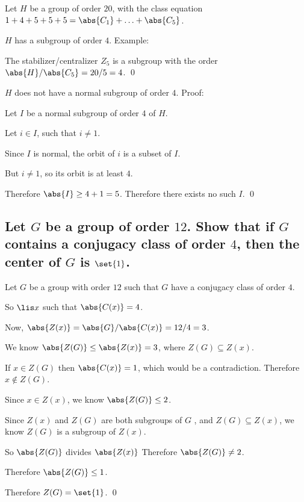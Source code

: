 
        Let $H$ be a group of order $20$, with the class equation $1+4+5+5+5 = \abs{C_1} +\hdots + \abs{C_5}$.
    
        $H$ has a subgroup of order $4$.
        Example:

        The stabilizer/centralizer $Z_5$ is a subgroup with the order $\abs{H} / \abs{C_5} = 20/5 = 4$.
        \qed

        $H$ does not have a normal subgroup of order $4$.
        Proof:

        Let $I$ be a normal subgroup of order $4$ of $H$.
        
        Let $i \in I$, such that $i \neq 1$.

        Since $I$ is normal, the orbit of $i$ is a subset of $I$.

        But $i \neq 1$, so its orbit is at least $4$.

        Therefore $\abs{I} \geq 4 + 1 = 5$.
        Therefore there exists no such $I$.
        \qed


    \subsection[(iii)]{Let $G$ be a group of order $12$. Show that if $G$ contains a conjugacy class
        of order $4$, then the center of $G$ is $\set{1}$.}

        Let $G$ be a group with order $12$
        such that $G$ have a conjugacy class of order $4$.

        So $\lis x$ such that $\abs{C(x)} = 4$.
        
        Now, $\abs{Z(x)} = \abs{G} / \abs{C(x)} = 12/4 = 3$.

        We know $\abs{Z(G)} \leq \abs{Z(x)} = 3$, where $Z(G)\subseteq Z(x)$.
        
        If $x \in Z(G)$ then $\abs{C(x)} = 1$, which would be a contradiction.
        Therefore $x \not\in Z(G)$.

        Since $x \in Z(x)$, we know $\abs{Z(G)} \leq 2$.

        Since $Z(x)$ and $Z(G)$ are both subgroups of $G$
        , and $Z(G) \subseteq Z(x)$,
        we know $Z(G)$ is a subgroup of $Z(x)$.

        So $\abs{Z(G)}$ divides $\abs{Z(x)}$
        Therefore $\abs{Z(G)} \neq 2$.

        
        Therefore $\abs{Z(G)} \leq 1$.

        Therefore $Z(G) = \set{1}$.
        \qed